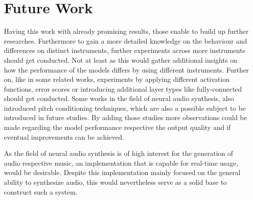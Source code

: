 \section{Future Work}
Having this work with already promising results, those enable to build up further researches. Furthermore to gain a more detailed knowledge on the behaviour and differences on distinct instruments, further experiments across more instruments should get conducted. Not at least as this would gather additional insights on how the performance of the models differs by using different instruments. Further on, like in some related works, experiments by applying different activation functions, error scores or introducing additional layer types like fully-connected should get conducted. Some works in the field of neural audio synthesis, also introduced pitch conditioning techniques, which are also a possible subject to be introduced in future studies. By adding those studies more observations could be made regarding the model performance respective the output quality and if eventual improvements can be achieved.

As the field of neural audio synthesis is of high interest for the generation of audio respective music, an implementation that is capable for real-time usage, would be desirable. Despite this implementation mainly focused on the general ability to synthesize audio, this would nevertheless serve as a solid base to construct such a system.